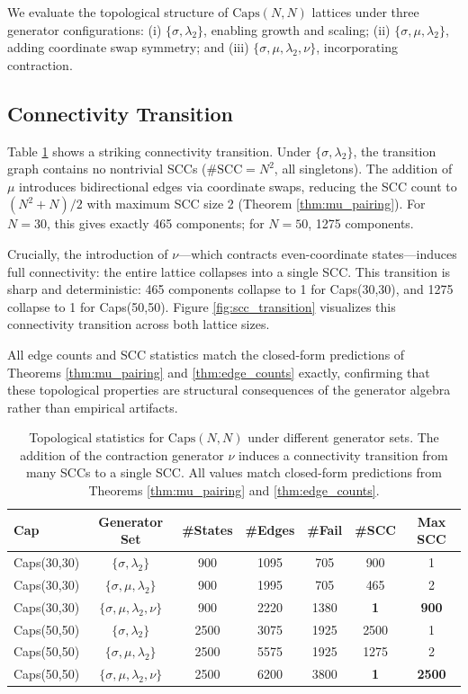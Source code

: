 \documentclass[11pt]{article}
\theoremstyle{definition}
\begin{document}
We evaluate the topological structure of $\mathrm{Caps}(N,N)$ lattices under three generator configurations: (i) $\{\sigma,\lambda_2\}$, enabling growth and scaling; (ii) $\{\sigma,\mu,\lambda_2\}$, adding coordinate swap symmetry; and (iii) $\{\sigma,\mu,\lambda_2,\nu\}$, incorporating contraction.

\subsection{Connectivity Transition}

Table \ref{tab:topology} shows a striking connectivity transition. Under $\{\sigma,\lambda_2\}$, the transition graph contains no nontrivial SCCs ($\#\mathrm{SCC} = N^2$, all singletons). The addition of $\mu$ introduces bidirectional edges via coordinate swaps, reducing the SCC count to $(N^2+N)/2$ with maximum SCC size 2 (Theorem \ref{thm:mu_pairing}). For $N=30$, this gives exactly 465 components; for $N=50$, 1275 components.

Crucially, the introduction of $\nu$—which contracts even-coordinate states—induces full connectivity: the entire lattice collapses into a single SCC. This transition is sharp and deterministic: 465 components collapse to 1 for Caps(30,30), and 1275 collapse to 1 for Caps(50,50). Figure \ref{fig:scc_transition} visualizes this connectivity transition across both lattice sizes.

All edge counts and SCC statistics match the closed-form predictions of Theorems \ref{thm:mu_pairing} and \ref{thm:edge_counts} exactly, confirming that these topological properties are structural consequences of the generator algebra rather than empirical artifacts.

\begin{table}[h]
\centering
\caption{Topological statistics for $\mathrm{Caps}(N,N)$ under different generator sets. The addition of the contraction generator $\nu$ induces a connectivity transition from many SCCs to a single SCC. All values match closed-form predictions from Theorems \ref{thm:mu_pairing} and \ref{thm:edge_counts}.}
\label{tab:topology}
\begin{tabular}{lcccccc}
\toprule
Cap & Generator Set & \#States & \#Edges & \#Fail & \#SCC & Max SCC \\
\midrule
Caps(30,30) & $\{\sigma,\lambda_2\}$ & 900 & 1095 & 705 & 900 & 1 \\
Caps(30,30) & $\{\sigma,\mu,\lambda_2\}$ & 900 & 1995 & 705 & 465 & 2 \\
Caps(30,30) & $\{\sigma,\mu,\lambda_2,\nu\}$ & 900 & 2220 & 1380 & \textbf{1} & \textbf{900} \\
\midrule
Caps(50,50) & $\{\sigma,\lambda_2\}$ & 2500 & 3075 & 1925 & 2500 & 1 \\
Caps(50,50) & $\{\sigma,\mu,\lambda_2\}$ & 2500 & 5575 & 1925 & 1275 & 2 \\
Caps(50,50) & $\{\sigma,\mu,\lambda_2,\nu\}$ & 2500 & 6200 & 3800 & \textbf{1} & \textbf{2500} \\
\bottomrule
\end{tabular}
\end{table}
\end{document}
